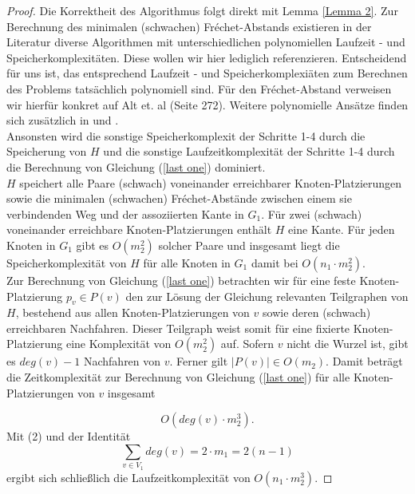 \documentclass[a4paper, 12pt, twoside]{article}
\theoremstyle{Format1} %
\begin{document}
\begin{proof}
Die Korrektheit des Algorithmus folgt direkt mit Lemma \ref{Lemma 2}.
Zur Berechnung des minimalen (schwachen) Fréchet-Abstands existieren in der Literatur diverse Algorithmen mit unterschiedlichen polynomiellen Laufzeit - und Speicherkomplexitäten.
Diese wollen wir hier lediglich referenzieren. Entscheidend für uns ist, das entsprechend Laufzeit - und Speicherkomplexiäten zum Berechnen des Problems tatsächlich polynomiell sind.
Für den Fréchet-Abstand verweisen wir hierfür konkret auf Alt et. al \cite{Alt2} (Seite 272). Weitere polynomielle Ansätze finden sich zusätzlich in \cite{Ref1} und \cite{Ref2}.
\\
Ansonsten wird die sonstige Speicherkomplexit der Schritte 1-4 durch die Speicherung von $H$ und die sonstige Laufzeitkomplexität der Schritte 1-4 durch die Berechnung von
Gleichung (\ref{last one}) dominiert.
\\
$H$ speichert alle Paare (schwach) voneinander erreichbarer Knoten-Platzierungen sowie die minimalen (schwachen) Fréchet-Abstände zwischen einem sie verbindenden Weg
und der assoziierten Kante in $G_1$. Für zwei (schwach) voneinander erreichbare Knoten-Platzierungen enthält $H$ eine Kante. Für jeden Knoten in $G_1$ gibt es $O(m_2^2)$ solcher Paare
und insgesamt liegt die Speicherkomplexität von $H$ für alle Knoten in $G_1$ damit bei $O(n_1 \cdot m_2^2)$.
\\
Zur Berechnung von Gleichung (\ref{last one}) betrachten wir für eine feste Knoten-Platzierung $p_v \in P(v)$ den zur Lösung der Gleichung relevanten Teilgraphen von $H$,
bestehend aus allen Knoten-Platzierungen von $v$ sowie deren (schwach) erreichbaren Nachfahren. Dieser Teilgraph weist somit für eine fixierte Knoten-Platzierung eine Komplexität von $O(m_2^2)$ auf.
Sofern $v$ nicht die Wurzel ist, gibt es $deg(v)-1$ Nachfahren von $v$. Ferner gilt $|P(v)| \in O(m_2)$. Damit beträgt die Zeitkomplexität zur Berechnung von Gleichung (\ref{last one}) für alle
Knoten-Platzierungen von $v$ insgesamt

\begin{equation}
	O(deg(v) \cdot m_2^3).
\end{equation}
Mit (2) und der Identität
\begin{equation}
	\sum_{v \in V_1} deg(v) = 2 \cdot m_1 = 2(n-1)
\end{equation}
ergibt sich schließlich die Laufzeitkomplexität von $O(n_1 \cdot m_2^3).$
\end{proof}
\newpage
\end{document}
